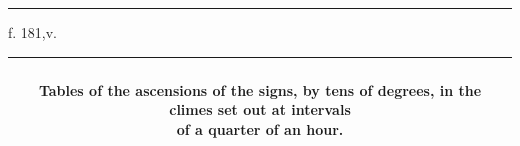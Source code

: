 \documentclass[11pt]{article}
\renewcommand{\arraystretch}{1.18}
\begin{document}
\par\vspace{-1mm}\noindent\rule{\textwidth}{.4pt}\par\vspace{1mm}
\begin{center}{\small f. 181,v.}\end{center}\vspace{-3mm}
\begin{center}\setlength{\tabcolsep}{2.5pt}\renewcommand{\arraystretch}{1.0}\begin{tabular}{||c|c|>{\centering\arraybackslash}p{23mm}|>{\centering\arraybackslash}p{23mm}|>{\centering\arraybackslash}p{23mm}|>{\centering\arraybackslash}p{23mm}|>{\centering\arraybackslash}p{23mm}|>{\centering\arraybackslash}p{23mm}||}\hline
\multicolumn{8}{||c||}{\parbox{175mm}{\centering{}\\\textbf{Tables of the ascensions of the signs, by tens of degrees, in the climes set out at intervals}\\\textbf{of a quarter of an hour.}\vspace{1mm}}} \\ \hline

\end{tabular}
\end{center}
\end{document}
